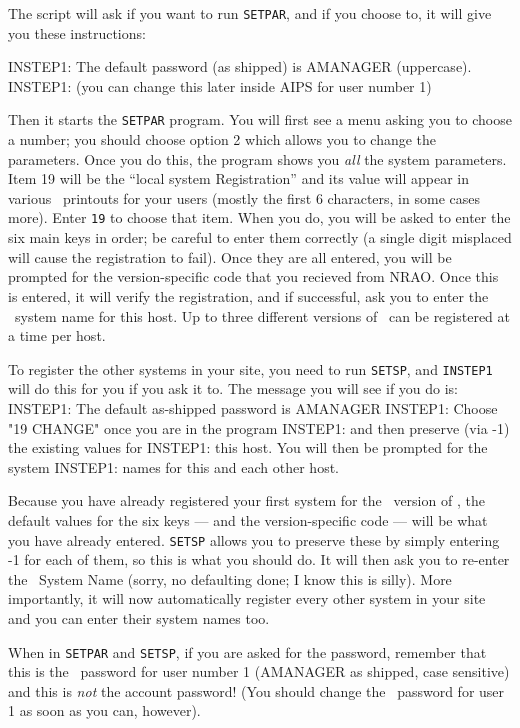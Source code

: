 The script will ask if you want to run {\tt SETPAR}, and if you choose
to, it will give you these instructions:\medskip

\fortran
INSTEP1: The default password (as shipped) is AMANAGER (uppercase).
INSTEP1: (you can change this later inside AIPS for user number 1)
\endfortran
\medskip

\noindent Then it starts the {\tt SETPAR} program.  You will first see a
menu asking you to choose a number; you should choose option 2 which
allows you to change the parameters.  Once you do this, the program
shows you {\it all\/} the system parameters.  Item 19 will be the
``local system Registration'' and its value will appear in various
\AIPS\ printouts for your users (mostly the first 6 characters, in some
cases more).  Enter {\tt 19} to choose that item.  When you do, you will
be asked to enter the six main keys in order; be careful to enter them
correctly (a single digit misplaced will cause the registration to
fail).  Once they are all entered, you will be prompted for the
version-specific code that you recieved from NRAO.  Once this is
entered, it will verify the registration, and if successful, ask you to
enter the \AIPS\ system name for this host.  Up to three different
versions of \AIPS\ can be registered at a time per host.

To register the other systems in your site, you need to run {\tt SETSP},
and {\tt INSTEP1} will do this for you if you ask it to.  The message
you will see if you do is:\medskip
\fortran
INSTEP1: The default as-shipped password is AMANAGER
INSTEP1: Choose "19 CHANGE" once you are in the program
INSTEP1: and then preserve (via -1) the existing values for
INSTEP1: this host.  You will then be prompted for the system
INSTEP1: names for this and each other host.
\endfortran

\medskip\noindent Because you have already registered your first system
for the \THISVER\ version of \AIPS, the default values for the six keys
--- and the version-specific code --- will be what you have already
entered.  {\tt SETSP} allows you to preserve these by simply entering -1
for each of them, so this is what you should do.  It will then ask you
to re-enter the \AIPS\ System Name (sorry, no defaulting done; I know
this is silly).  More importantly, it will now automatically register
every other system in your site and you can enter their system names
too.

When in {\tt SETPAR} and {\tt SETSP}, if you are asked for the password,
remember that this is the \AIPS\ password for user number 1 (AMANAGER as
shipped, case sensitive) and this is {\it not\/} the account password!
(You should change the \AIPS\ password for user 1 as soon as you can,
however).


